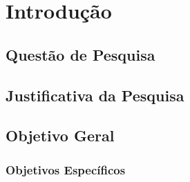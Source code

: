 \chapter[Introdução]{Introdução}

\section{Questão de Pesquisa}

\section{Justificativa da Pesquisa}

\section{Objetivo Geral}

\subsection{Objetivos Específicos}
